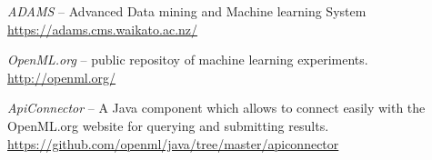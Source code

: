 %

\begin{thebibliography}{999}

		\textit{ADAMS} -- Advanced Data mining and Machine learning System \\
		\url{https://adams.cms.waikato.ac.nz/}{}
		
		\textit{OpenML.org} -- public repositoy of machine learning experiments. \\
		\url{http://openml.org/}{}
		
		\textit{ApiConnector} -- A Java component which allows to connect easily with the OpenML.org website for querying and submitting results. \\
		\url{https://github.com/openml/java/tree/master/apiconnector}{}

\end{thebibliography}
